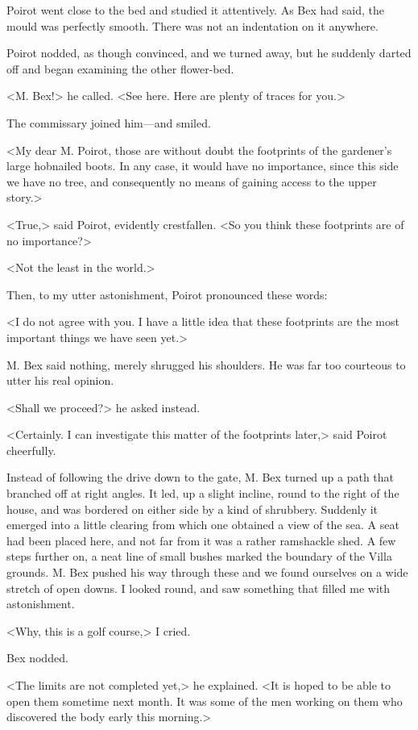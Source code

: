  Poirot went close to the bed and studied it attentively. As Bex had said, the mould was perfectly smooth. There was not an indentation on it anywhere. 

 Poirot nodded, as though convinced, and we turned away, but he suddenly darted off and began examining the other flower-bed. 

 <M. Bex!> he called. <See here. Here are plenty of traces for you.> 

 The commissary joined him—and smiled. 

 <My dear M. Poirot, those are without doubt the footprints of the gardener's large hobnailed boots. In any case, it would have no importance, since this side we have no tree, and consequently no means of gaining access to the upper story.> 

 <True,> said Poirot, evidently crestfallen. <So you think these footprints are of no importance?> 

 <Not the least in the world.> 

 Then, to my utter astonishment, Poirot pronounced these words: 

 <I do not agree with you. I have a little idea that these footprints are the most important things we have seen yet.> 

 M. Bex said nothing, merely shrugged his shoulders. He was far too courteous to utter his real opinion. 

 <Shall we proceed?> he asked instead. 

 <Certainly. I can investigate this matter of the footprints later,> said Poirot cheerfully. 

 Instead of following the drive down to the gate, M. Bex turned up a path that branched off at right angles. It led, up a slight incline, round to the right of the house, and was bordered on either side by a kind of shrubbery. Suddenly it emerged into a little clearing from which one obtained a view of the sea. A seat had been placed here, and not far from it was a rather ramshackle shed. A few steps further on, a neat line of small bushes marked the boundary of the Villa grounds. M. Bex pushed his way through these and we found ourselves on a wide stretch of open downs. I looked round, and saw something that filled me with astonishment. 

 <Why, this is a golf course,> I cried. 

 Bex nodded. 

 <The limits are not completed yet,> he explained. <It is hoped to be able to open them sometime next month. It was some of the men working on them who discovered the body early this morning.> 

